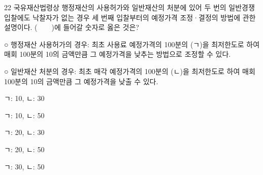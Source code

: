\begin{question}{22}
국유재산법령상 행정재산의 사용허가와 일반재산의 처분에 있어 두 번의 일반경쟁입찰에도 낙찰자가 없는 경우 세 번째 입찰부터의 예정가격 조정·결정의 방법에 관한 설명이다. (　　)에 들어갈 숫자로 옳은 것은?
\begin{framedtext}
○ 행정재산 사용허가의 경우: 최초 사용료 예정가격의 100분의 (ㄱ)을 최저한도로 하여 매회 100분의 10의 금액만큼 그 예정가격을 낮추는 방법으로 조정할 수 있다. \par
○ 일반재산 처분의 경우: 최초 매각 예정가격의 100분의 (ㄴ)을 최저한도로 하여 매회 100분의 10의 금액만큼 그 예정가격을 낮출 수 있다. \par
\end{framedtext}
\begin{choices}
  \item ㄱ: 10, ㄴ: 30
  \item ㄱ: 10, ㄴ: 50
  \item ㄱ: 20, ㄴ: 30
  \item ㄱ: 20, ㄴ: 50
  \item ㄱ: 30, ㄴ: 50
\end{choices}
\end{question}

